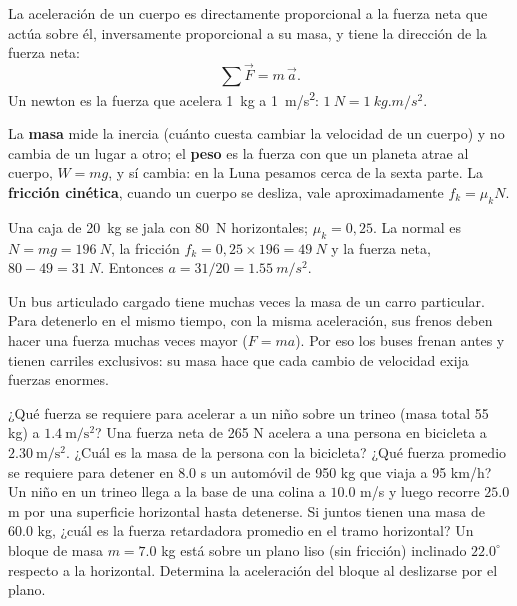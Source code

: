 \documentclass[11pt]{article}
\begin{document}
\begin{teorema}
La aceleración de un cuerpo es directamente proporcional a la fuerza neta que actúa sobre él,
inversamente proporcional a su masa, y tiene la dirección de la fuerza neta:
\[
  \sum \vec F = m\,\vec a.
\]
Un newton es la fuerza que acelera \qty{1}{kg} a \qty{1}{m/s^2}: $\qty{1}{N} = \qty{1}{kg.m/s^2}$.
\end{teorema}

La \textbf{masa} mide la inercia (cuánto cuesta cambiar la velocidad de un cuerpo) y no cambia
de un lugar a otro; el \textbf{peso} es la fuerza con que un planeta atrae al cuerpo, $W = mg$,
y sí cambia: en la Luna pesamos cerca de la sexta parte. La \textbf{fricción cinética}, cuando
un cuerpo se desliza, vale aproximadamente $f_k = \mu_k N$.

\begin{ejemplo}
Una caja de \qty{20}{kg} se jala con \qty{80}{N} horizontales; $\mu_k = 0{,}25$. La normal es
$N = mg = \qty{196}{N}$, la fricción $f_k = 0{,}25 \times 196 = \qty{49}{N}$ y la fuerza neta,
$80 - 49 = \qty{31}{N}$. Entonces $a = 31/20 = \qty{1,55}{m/s^2}$.
\end{ejemplo}

\begin{aplicacion}
Un bus articulado cargado tiene muchas veces la masa de un carro particular. Para detenerlo en
el mismo tiempo, con la misma aceleración, sus frenos deben hacer una fuerza muchas veces
mayor ($F = ma$). Por eso los buses frenan antes y tienen carriles exclusivos: su masa hace
que cada cambio de velocidad exija fuerzas enormes.
\end{aplicacion}

\begin{preguntas}
\pregunta ¿Qué fuerza se requiere para acelerar a un niño sobre un trineo (masa total 55 kg) a
$\num{1,4}\ \mathrm{m/s^2}$?
\espacio{2cm}
\pregunta Una fuerza neta de 265 N acelera a una persona en bicicleta a
$\num{2,30}\ \mathrm{m/s^2}$. ¿Cuál es la masa de la persona con la bicicleta?
\espacio{2cm}
\pregunta ¿Qué fuerza promedio se requiere para detener en $\num{8,0}$ s un automóvil de 950 kg
que viaja a 95 km/h?
\espacio{2.5cm}
\pregunta Un niño en un trineo llega a la base de una colina a $\num{10,0}$ m/s y luego recorre
$\num{25,0}$ m por una superficie horizontal hasta detenerse. Si juntos tienen una masa de
$\num{60,0}$ kg, ¿cuál es la fuerza retardadora promedio en el tramo horizontal?
\espacio{3cm}
\pregunta Un bloque de masa $m = \num{7,0}$ kg está sobre un plano liso (sin fricción) inclinado
$\num{22,0}^\circ$ respecto a la horizontal. Determina la aceleración del bloque al deslizarse
por el plano.
\espacio{3cm}
\end{preguntas}
\end{document}
